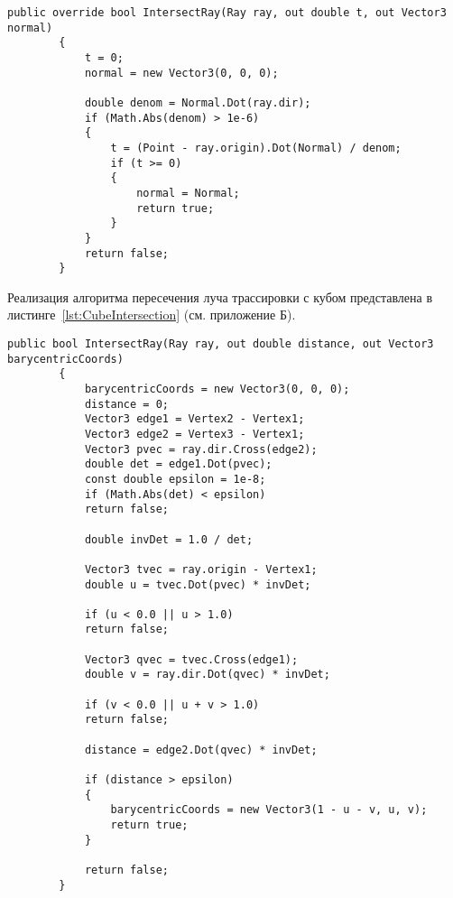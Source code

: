 \clearpage
\begin{center}
	\begin{lstlisting}[label={lst:WallIntersection}, captionpos={t}, caption={Алгоритм поиска точки пересечения луча с плоскостью (стеной)}]
		public override bool IntersectRay(Ray ray, out double t, out Vector3 normal)
		{
			t = 0;
			normal = new Vector3(0, 0, 0);
			
			double denom = Normal.Dot(ray.dir);
			if (Math.Abs(denom) > 1e-6)
			{
				t = (Point - ray.origin).Dot(Normal) / denom;
				if (t >= 0)
				{
					normal = Normal;
					return true;
				}
			}
			return false;
		}
	\end{lstlisting}
\end{center}

Реализация алгоритма пересечения луча трассировки с кубом представлена в листинге~\ref{lst:CubeIntersection} (см. приложение Б).

\clearpage
\begin{center}
	\begin{lstlisting}[label={lst:TriangleIntersection}, captionpos={t}, caption={Алгоритм поиска точки пересечения луча с треугольным полигоном}]
		public bool IntersectRay(Ray ray, out double distance, out Vector3 barycentricCoords)
		{
			barycentricCoords = new Vector3(0, 0, 0);
			distance = 0;
			Vector3 edge1 = Vertex2 - Vertex1;
			Vector3 edge2 = Vertex3 - Vertex1;
			Vector3 pvec = ray.dir.Cross(edge2);
			double det = edge1.Dot(pvec);
			const double epsilon = 1e-8;
			if (Math.Abs(det) < epsilon)
			return false;
			
			double invDet = 1.0 / det;
			
			Vector3 tvec = ray.origin - Vertex1;
			double u = tvec.Dot(pvec) * invDet;
			
			if (u < 0.0 || u > 1.0)
			return false;
			
			Vector3 qvec = tvec.Cross(edge1);
			double v = ray.dir.Dot(qvec) * invDet;
			
			if (v < 0.0 || u + v > 1.0)
			return false;
			
			distance = edge2.Dot(qvec) * invDet;
			
			if (distance > epsilon)
			{
				barycentricCoords = new Vector3(1 - u - v, u, v);
				return true;
			}
			
			return false;
		}
	\end{lstlisting}
\end{center}


